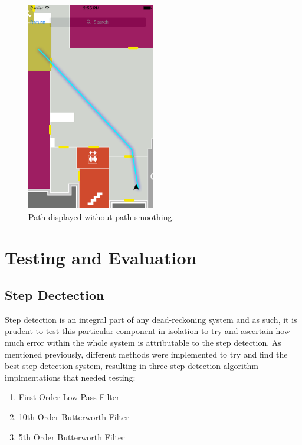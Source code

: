 \documentclass[12pt,a4paper]{report}
\begin{document}
\begin{figure}[]
\center
\includegraphics[width=0.5\textwidth]{images/smoothPath.png}
\caption{Path displayed without path smoothing.}
\label{fig:smoothPath}
\end{figure}



\chapter{Testing and Evaluation}

\section{Step Dectection}
\label{sec:stepTesting}

Step detection is an integral part of any dead-reckoning system and as such, 
it is prudent to test this particular component in isolation to try and ascertain how much error within the whole system is attributable to the step detection.
As mentioned previously, different methods were implemented to try and find the best step detection system, resulting in three step detection algorithm implmentations that needed testing:
\begin{enumerate}
	\item First Order Low Pass Filter
	\item 10th Order Butterworth Filter
	\item 5th Order Butterworth Filter
\end{enumerate}
\end{document}
